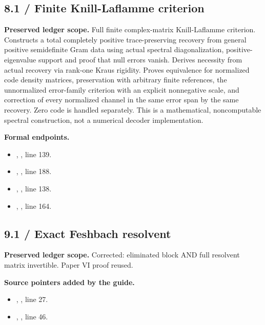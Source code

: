 \subsection{8.1 / Finite Knill-Laflamme criterion}
\label{result:8.1}
\textbf{Preserved ledger scope.} Full finite complex-matrix Knill-Laflamme criterion. Constructs a total completely positive trace-preserving recovery from general positive semidefinite Gram data using actual spectral diagonalization, positive-eigenvalue support and proof that null errors vanish. Derives necessity from actual recovery via rank-one Kraus rigidity. Proves equivalence for normalized code density matrices, preservation with arbitrary finite references, the unnormalized error-family criterion with an explicit nonnegative scale, and correction of every normalized channel in the same error span by the same recovery. Zero code is handled separately. This is a mathematical, noncomputable spectral construction, not a numerical decoder implementation.

\textbf{Formal endpoints.}\begin{itemize}
\item {}, , line 139.
\item {}, , line 188.
\item {}, , line 138.
\item {}, , line 164.
\end{itemize}
\subsection{9.1 / Exact Feshbach resolvent}
\label{result:9.1}
\textbf{Preserved ledger scope.} Corrected: eliminated block AND full resolvent matrix invertible. Paper VI proof reused.

\textbf{Source pointers added by the guide.}\begin{itemize}
\item {}, , line 27.
\item {}, , line 46.
\end{itemize}
